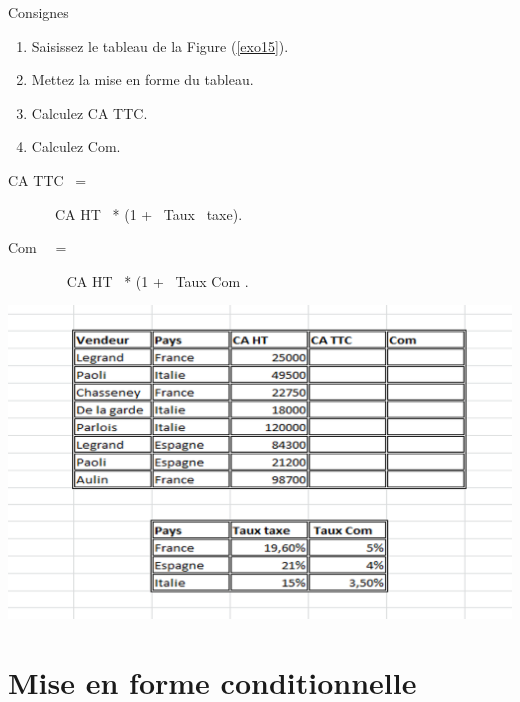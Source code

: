 \begin{exercice} 
	Consignes 
	\begin{enumerate}		
		\item  Saisissez le tableau  de la Figure (\ref{exo15}).  				
		\item  Mettez la mise en forme  du tableau.
		\item Calculez CA TTC.
		\item Calculez Com.
	\end{enumerate}	
\begin{description}
	\item[CA TTC  =]   CA HT  * (1 +  Taux  taxe). 
	\item[Com   =]     CA HT  * (1 +  Taux Com . 
\end{description}
\end{exercice}
\begin{center}  
	\includegraphics[scale=0.2,width= \linewidth]{img/ex016} 
	\label{exo15}
\end{center}
\section{Mise en forme conditionnelle}
